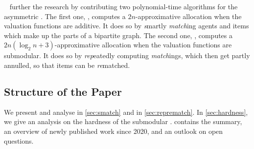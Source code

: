~\cite{APNSWuSVþUM} further the research by contributing two polynomial-time algorithms for the asymmetric \NSW.
The first one, \emph{\SMatch}, computes a \(2n\)-approximative allocation when the valuation functions are additive.
It does so by \textsl{s}martly \textsl{match}ing agents and items which make up the parts of a bipartite graph.
The second one, \emph{\RepReMatch}, computes a \(2n (\log_2 n + 3)\)-approximative allocation when the valuation functions are submodular.
It does so by \textsl{rep}eatedly computing \textsl{match}ings, which then get partly annulled, so that items can be \textsl{re}matched.

\subsection{Structure of the Paper}
\label{subsec:intro:structure}

We present and analyse \SMatch{} in \cref{sec:smatch} and \RepReMatch{} in \cref{sec:reprematch}.
In \cref{sec:hardness}, we give an analysis on the hardness of the submodular \NSW.
 contains the summary, an overview of newly published work since 2020, and an outlook on open questions.




%


